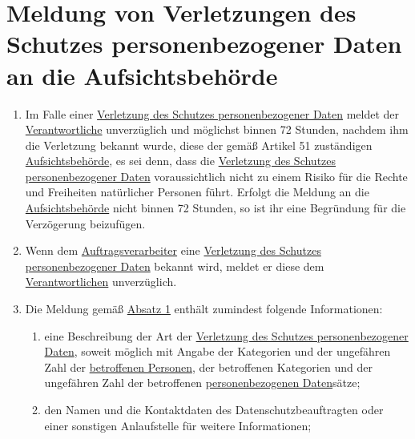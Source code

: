 \chapter{Meldung von Verletzungen des Schutzes personenbezogener Daten an die Aufsichtsbehörde}
\label{ch:33}


\begin{enumerate}

  \item Im Falle einer \hyperref[itm:04-12]{Verletzung des Schutzes personenbezogener Daten} meldet der \hyperref
   [itm:04-7]{Verantwortliche} unverzüglich und möglichst binnen 72 Stunden, nachdem ihm die Verletzung bekannt wurde,
   diese der gemäß Artikel 51 zuständigen
   \hyperref[itm:04-21]{Aufsichtsbehörde}, es sei denn, dass die \hyperref[itm:04-12]{Verletzung des Schutzes
    personenbezogener Daten} voraussichtlich nicht zu einem Risiko für die Rechte und Freiheiten natürlicher Personen
    führt. Erfolgt die Meldung an die \hyperref[itm:04-21]{Aufsichtsbehörde} nicht binnen 72 Stunden, so ist ihr eine
    Begründung für die Verzögerung beizufügen.
  \label{itm:33-1}

  \item Wenn dem \hyperref[itm:04-8]{Auftragsverarbeiter} eine \hyperref[itm:04-12]{Verletzung des Schutzes
   personenbezogener Daten} bekannt wird, meldet er diese dem \hyperref[itm:04-7]{Verantwortlichen} unverzüglich.
  \label{itm:33-2}

  \item Die Meldung gemäß \hyperref[itm:33-1]{Absatz 1} enthält zumindest folgende Informationen:
  \label{itm:33-3}

  \begin{enumerate}
  
    \item eine Beschreibung der Art der \hyperref[itm:04-12]{Verletzung des Schutzes personenbezogener Daten}, soweit
     möglich mit Angabe der Kategorien und der ungefähren Zahl der \hyperref[itm:04-1]{betroffenen Personen}, der
     betroffenen Kategorien und der ungefähren Zahl der betroffenen \hyperref[itm:04-1]{personenbezogenen Daten}sätze;
    \label{itm:33-3a}

    \item den Namen und die Kontaktdaten des Datenschutzbeauftragten oder einer sonstigen Anlaufstelle für weitere
     Informationen;
    \label{itm:33-3b}


\end{enumerate}
\end{enumerate}
